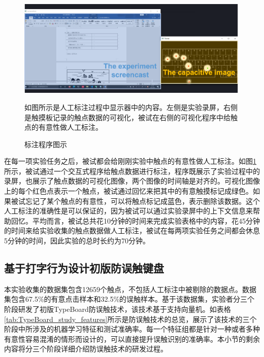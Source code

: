 \begin{figure}[!tbh]
	\includegraphics[width=1.0\linewidth]{figures/TypeBoard_label_process.png}
	\centering
	\caption*{如图所示是人工标注过程中显示器中的内容。左侧是实验录屏，右侧是触摸板记录的触点数据的可视化，被试在右侧的可视化程序中给触点的有意性做人工标注。}
	\caption{标注程序图示}
	\label{fig:TypeBoard_label_process}
\end{figure}

在每一项实验任务之后，被试都会给刚刚实验中触点的有意性做人工标注。如图\ref{fig:TypeBoard_label_process}所示，被试通过一个交互式程序给触点数据进行标注，程序既展示了实验过程中的录屏，也展示了触点数据的可视化图像，两个图像的时间轴是对齐的。可视化图像上的每个红色点表示一个触点，被试通过回忆来把其中的有意触摸标记成绿色。如果被试忘记了某个触点的有意性，可以将触点标记成蓝色，表示删除该数据。这个人工标注的准确性是可以保证的，因为被试可以通过实验录屏中的上下文信息来帮助回忆。平均而言，被试总共花10分钟的时间来完成实验表格中的内容，花45分钟的时间来给实验收集的触点数据做人工标注，被试在每两项实验任务之间都会休息5分钟的时间，因此实验的总时长约为70分钟。

\subsection{基于打字行为设计初版防误触键盘}\label{section:model_TypeBoard}

本实验收集的数据集包含12659个触点，不包括人工标注中被剔除的数据点。数据集包含67.5\%的有意点击样本和32.5\%的误触样本。基于该数据集，实验者分三个阶段研发了初版TypeBoard防误触技术，该技术基于支持向量机。如表格\ref{tab:TypeBoard_study_features}所示是防误触技术的总览，展示了该技术的三个阶段中所涉及的机器学习特征和测试准确率。每一个特征组都是针对一种或者多种有意性容易混淆的情形而设计的，可以直接提升误触识别的准确率。本小节的剩余内容将分三个阶段详细介绍防误触技术的研发过程。


